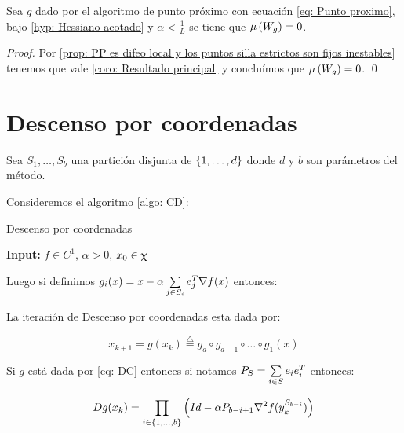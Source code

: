 \begin{corollary}
	\label{coro: PP converge a minimos}
	Sea $g$ dado por el algoritmo de punto pr\'oximo con ecuaci\'on \ref{eq: Punto proximo}, bajo \ref{hyp: Hessiano acotado} y $\alpha < \frac{1}{L}$ se tiene que $\mu\left(W_g\right) = 0$.
\end{corollary}

\begin{proof}
	Por \ref{prop: PP es difeo local y los puntos silla estrictos son fijos inestables} tenemos que vale \ref{coro: Resultado principal} y conclu\'imos que $\mu \left(W_g\right) = 0$. \qed
\end{proof}

\section{Descenso por coordenadas}

Sea $S_1, \dots, S_b$ una partici\'on disjunta de $\left\lbrace1, \dots, d\right\rbrace$ donde $d$ y $b$ son par\'ametros del m\'etodo. 

Consideremos el algoritmo \ref{algo: CD}:

\LinesNumbered
\begin{algorithm}[H]
	\caption{Descenso por coordenadas\label{algo: CD}}
	\textbf{Input:} $f \in C^1$, $\alpha >0$, $x_0 \in \upchi$ \\
\end{algorithm}

Luego si definimos $g_i(x) = x - \alpha \sum\limits_{j \in S_i}{e_j^T \nabla f(x)}$ entonces:

\begin{lemma}
	La iteraci\'on de Descenso por coordenadas esta dada por:
	
	\begin{equation}
		\label{eq: DC}
		x_{k+1} = g(x_k) \stackrel{\triangle}{=} g_d \circ g_{d-1} \circ \dots \circ g_1(x)
	\end{equation}
	
\end{lemma}

\begin{lemma}
	Si $g$ est\'a dada por \ref{eq: DC} entonces si notamos $P_S = \sum\limits_{i \in S}{e_ie_i^T}$ entonces:
	
	\begin{equation}
	\label{eq: Diferencial de DC}
	Dg(x_{k}) = \prod\limits_{i \in \left\lbrace1, \dots, b\right\rbrace}{\left(Id - \alpha P_{b-i+1}\nabla ^2 f(y_{k}^{S_{b-i}})\right)}
	\end{equation}
	
\end{lemma}

